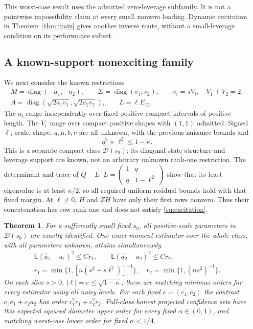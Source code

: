 \documentclass[11pt,a4paper]{amsart}
\theoremstyle{plain}
\newtheorem{theorem}{Theorem}[section]
\theoremstyle{definition}
\theoremstyle{remark}
\newcommand{\EE}{\mathbb{E}}
\DeclareMathOperator{\diag}{diag}
\begin{document}
This worst-case result uses the admitted zero-leverage subfamily. It is
not a pointwise impossibility claim at every small nonzero loading.
Dynamic excitation in Theorem~\ref{thm:main} gives another inverse route,
without a small-leverage condition on its performance subset.

\subsection{A known-support nonexciting family}

We next consider the known restrictions
\begin{equation}\label{eq:diagonal-family}
 \begin{gathered}
 M=\diag(-a_1,-a_2),\qquad \Sigma=\diag(v_1,v_2),\qquad
 v_i=sV_i,\quad V_1+V_2=2,\\
 A=\diag(\sqrt{2a_1v_1},\sqrt{2a_2v_2}),\qquad L=\ell E_{12}.
 \end{gathered}
\end{equation}
The $a_i$ range independently over fixed positive compact intervals of
positive length. The $V_i$ range over compact positive shapes with
$(1,1)$ admitted. Signed $\ell$, scale, shape, $q,\mu,b,\nu$ are all
unknown, with the previous nuisance bounds and
\begin{equation}\label{eq:diagonal-margin}
 q^2+\ell^2\le1-\kappa.
\end{equation}
This is a separate compact class $\mathcal D(s_0)$: its diagonal state
structure and leverage support are known, not an arbitrary unknown
rank-one restriction. The determinant and trace of
$Q-L^\top L=\left(\begin{smallmatrix}1&q\\q&1-\ell^2\end{smallmatrix}\right)$
show that its least eigenvalue is at least $\kappa/2$, so all required
uniform residual bounds hold with that fixed margin. At $\ell\ne0$,
$H$ and $ZH$ have only their first rows nonzero. Thus their concatenation
has row rank one and does not satisfy \eqref{eq:excitation}.

\begin{theorem}\label{thm:diagonal}
For a sufficiently small fixed $s_0$, all positive-scale parameters in
$\mathcal D(s_0)$ are exactly identified. One exact-moment estimator over
the whole class, with all parameters unknown, attains simultaneously
\begin{equation}\label{eq:directional-rates}
 \begin{gathered}
 \EE(\widehat a_1-a_1)^2\le Cr_1,\qquad
 \EE(\widehat a_2-a_2)^2\le Cr_2,\\
 r_1=\min\{1,[n(s^2+s\ell^2)]^{-1}\},\quad
 r_2=\min\{1,(ns^2)^{-1}\}.
 \end{gathered}
\end{equation}
On each slice $s>0$, $|\ell|=e\le\sqrt{1-\kappa}$, these are matching
minimax orders for every estimator using all noisy levels. For each fixed
$c=(c_1,c_2)$ the contrast $c_1a_1+c_2a_2$ has order
$c_1^2r_1+c_2^2r_2$. Full-class honest projected confidence sets have
this expected squared diameter upper order for every fixed
$\alpha\in(0,1)$, and matching worst-case lower order for fixed
$\alpha<1/4$.
\end{theorem}
\end{document}
